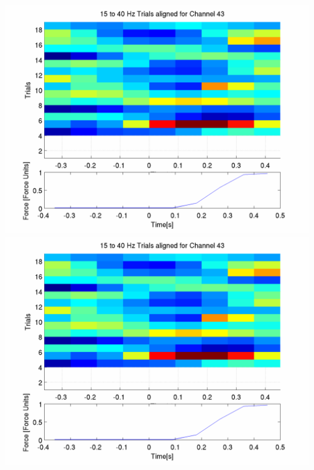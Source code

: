 \documentclass[12pt]{article}
\begin{document}
\includegraphics[scale=0.2]{noCAR/log_plot_5_aligned_trials.png}
\includegraphics[scale=0.2]{WithCAR/log_plot_5_aligned_trials.png}
\end{document}
